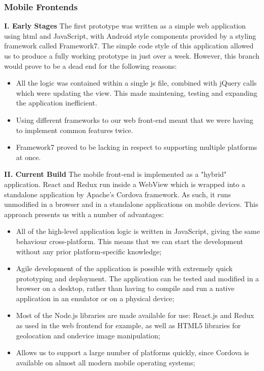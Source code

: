 \subsubsection{Mobile Frontends}

\textbf{I. Early Stages}
The first prototype was written as a simple web application using html and JavaScript, with Android style components provided by a styling framework called Framework7. The simple code style of this application allowed us to produce a fully working prototype in just over a week. However, this branch would prove to be a dead end for the following reasons:
\begin{itemize}
  \item All the logic was contained within a single js file, combined with jQuery calls which were updating the view. This made maintening, testing and expanding the application inefficient.
  \item Using different frameworks to our web front-end meant that we were having to implement common features twice.
  \item Framework7 proved to be lacking in respect to supporting multiple platforms at once.
\end{itemize}

\textbf{II. Current Build}
The mobile front-end is implemented as a "hybrid" application. React and Redux run inside a WebView which is wrapped into a standalone application by Apache's Cordova framework. As such, it runs unmodified in a browser and in a standalone applications on mobile devices. This approach presents us with a number of advantages:

\begin{itemize}
	\item All of the high-level application logic is written in JavaScript, giving the same behaviour cross-platform. This means that we can start the development without any prior platform-specific knowledge;
	\item Agile development of the application is possible with extremely quick prototyping and deployment. The application can be tested and modified in a browser on a desktop, rather than having to compile and run a native application in an emulator or on a physical device;
	\item Most of the Node.js libraries are made available for use: React.js and Redux as used in the web frontend for example, as well as HTML5 libraries for geolocation and ondevice image manipulation;
	\item Allows us to support a large number of platforms quickly, since Cordova is available on almost all modern mobile operating systems;
\end{itemize}

